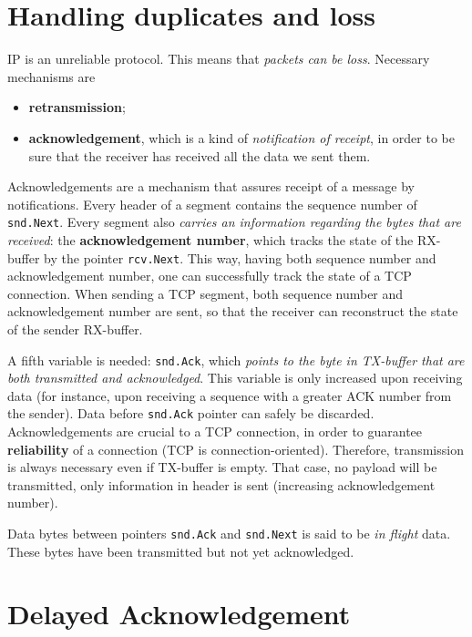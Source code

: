 \documentclass[a4paper, 11pt]{report}
\begin{document}
\section{Handling duplicates and loss}

IP is an unreliable protocol. This means that \emph{packets can be loss}.
Necessary mechanisms are

\begin{itemize}
	\item \textbf{retransmission};
	\item \textbf{acknowledgement}, which is a kind of \emph{notification
		of receipt}, in order to be sure that the receiver has received
		all the data we sent them.
\end{itemize}

Acknowledgements are a mechanism that assures receipt of a message by
notifications. Every header of a segment contains the sequence number of
\texttt{snd.Next}. Every segment also \emph{carries an information regarding
the bytes that are received}: the \textbf{acknowledgement number}, which tracks
the state of the RX-buffer by the pointer \texttt{rcv.Next}. This way, having
both sequence number and acknowledgement number, one can successfully track the
state of a TCP connection. When sending a TCP segment, both sequence number and
acknowledgement number are sent, so that the receiver can reconstruct the state
of the sender RX-buffer.

A fifth variable is needed: \texttt{snd.Ack}, which \emph{points to the byte in
TX-buffer that are both transmitted and acknowledged}. This variable is only
increased upon receiving data (for instance, upon receiving a sequence with a
greater ACK number from the sender). Data before \texttt{snd.Ack} pointer can
safely be discarded. Acknowledgements are crucial to a TCP connection, in order
to guarantee \textbf{reliability} of a connection (TCP is connection-oriented).
Therefore, transmission is always necessary even if TX-buffer is empty. That
case, no payload will be transmitted, only information in header is sent
(increasing acknowledgement number). 

Data bytes between pointers \texttt{snd.Ack} and \texttt{snd.Next} is said to
be \emph{in flight} data. These bytes have been transmitted but not yet
acknowledged.


\section{Delayed Acknowledgement}
\end{document}
